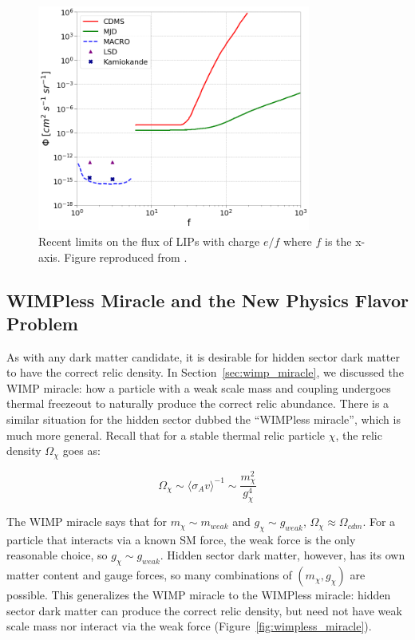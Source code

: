 \begin{figure}[htbp]
\begin{center}
\includegraphics[width=0.8\textwidth]{figures/theory/lip_limits.png}
\caption{Recent limits on the flux of \acs{LIP}s with charge $e/f$ where $f$ is the x-axis. Figure reproduced from \cite{Alvis2018}. }
\label{fig:lip_lims}
\end{center}
\end{figure}


\subsection{WIMPless Miracle and the New Physics Flavor Problem}
As with any dark matter candidate, it is desirable for hidden sector dark matter to have the correct relic density. In Section~\ref{sec:wimp_miracle}, we discussed the \ac{WIMP} miracle: how a particle with a weak scale mass and coupling undergoes thermal freezeout to naturally produce the correct relic abundance. There is a similar situation for the hidden sector dubbed the ``\ac{WIMP}less miracle'', which is much more general. Recall that for a stable thermal relic particle $\chi$, the relic density $\Omega_{\chi}$ goes as:

\begin{equation}
\Omega_{\chi} \sim \langle \sigma_{A}v \rangle^{-1} \sim \frac{m_{\chi}^{2}}{g_{\chi}^{4}}
\end{equation}

The \ac{WIMP} miracle says that for $m_{\chi} \sim m_{weak}$ and $g_{\chi} \sim g_{weak}$, $\Omega_{\chi} \approx \Omega_{cdm}$. For a particle that interacts via a known \ac{SM} force, the weak force is the only reasonable choice, so $g_{\chi} \sim g_{weak}$. Hidden sector dark matter, however, has its own matter content and gauge forces, so many combinations of $(m_{\chi}, g_{\chi})$ are possible. This generalizes the \ac{WIMP} miracle to the \ac{WIMP}less miracle: hidden sector dark matter can produce the correct relic density, but need not have weak scale mass nor interact via the weak force (Figure~\ref{fig:wimpless_miracle}).

